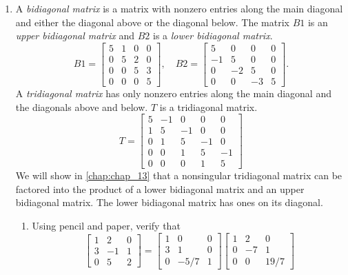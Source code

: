 \documentclass[../main.tex]{subfiles}
\begin{document}
\begin{enumerate}[label=\textbf{2.\arabic*}]
\item  A \emph{bidiagonal matrix} is a matrix with nonzero entries along the main diagonal and either the diagonal above or the diagonal below. The matrix $B 1$ is an \emph{upper bidiagonal matrix} and $B 2$ is a \emph{lower bidiagonal matrix}.
$$
B 1=\left[\begin{array}{llll}
5 & 1 & 0 & 0 \\
0 & 5 & 2 & 0 \\
0 & 0 & 5 & 3 \\
0 & 0 & 0 & 5
\end{array}\right], \quad B 2=\left[\begin{array}{cccc}
5 & 0 & 0 & 0 \\
-1 & 5 & 0 & 0 \\
0 & -2 & 5 & 0 \\
0 & 0 & -3 & 5
\end{array}\right].
$$
A \emph{tridiagonal matrix} has only nonzero entries along the main diagonal and the diagonals above and below. $T$ is a tridiagonal matrix.
$$
T=\left[\begin{array}{ccccc}
5 & -1 & 0 & 0 & 0 \\
1 & 5 & -1 & 0 & 0 \\
0 & 1 & 5 & -1 & 0 \\
0 & 0 & 1 & 5 & -1 \\
0 & 0 & 0 & 1 & 5
\end{array}\right]
$$
We will show in \autoref{chap:chap_13} that a nonsingular tridiagonal matrix can be factored into the product of a lower bidiagonal matrix and an upper bidiagonal matrix. The lower bidiagonal matrix has ones on its diagonal.

	\begin{enumerate}[label=\textbf{\alph*.}]
	\item Using pencil and paper, verify that
	$$
	\left[\begin{array}{ccc}
	1 & 2 & 0 \\
	3 & -1 & 1 \\
	0 & 5 & 2
	\end{array}\right]=\left[\begin{array}{ccc}
	1 & 0 & 0 \\
	3 & 1 & 0 \\
	0 & -5 / 7 & 1
	\end{array}\right]\left[\begin{array}{ccc}
	1 & 2 & 0 \\
	0 & -7 & 1 \\
	0 & 0 & 19 / 7
	\end{array}\right]
	$$


\end{enumerate}
\end{enumerate}
\end{document}
